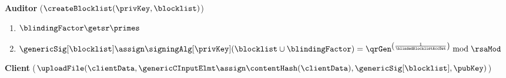 \begin{mdframed}[frametitle={Protocol for Detecting Exact Blocklist Matches}, 
frametitlealignment=\centering, 
	font=\small]
	
%	
%	
%	
%
%		
	
	\smallskip\noindent\textbf{Auditor} ($\createBlocklist(\privKey, \blocklist)$)
	
	
	\begin{enumerate}[leftmargin=1.5em]
		
		\item[\auditorLabel{nf:auditor:selectPrime}] $\blindingFactor \getsr \primes$ 
		
		\item[\auditorLabel{nf:auditor:publish}] $\genericSig[\blocklist] \assign 
		\signingAlg[\privKey](\blocklist \cup \blindingFactor) = 
		\qrGen^{\left(\frac{1}{\blindedBlocklistAccSet}\right)} \bmod \rsaMod$
	\end{enumerate}
	
	\smallskip\noindent\textbf{Client} ($\uploadFile(\clientData, \genericCInputElmt \assign
	\contentHash(\clientData), \genericSig[\blocklist], \pubKey)$)
	

\end{mdframed}
